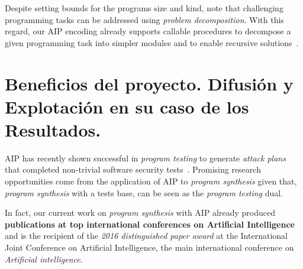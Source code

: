 \documentclass[10pt,a4paper]{paper}
\begin{document}
Despite setting bounds for the programs size and kind, note that challenging programming tasks can be addressed using {\em problem decomposition}. With this regard, our AIP encoding already supports callable procedures to decompose a given programming task into simpler modules and to enable recursive solutions~\cite{sergio:aprograming:icaps16,sergio:aprograming:ijcai16}.


\newpage
\section{Beneficios del proyecto. Difusión y Explotación en su caso de los Resultados.}
\label{subsec:beneficios}
AIP has recently shown successful in {\em program testing} to generate {\em attack plans} that completed non-trivial software security tests~\cite{hoffmann2015simulated,steinmetz2016revisiting,shmaryahu2016constructing,steinmetz2016goal}. Promising research opportunities come from the application of AIP to {\em program synthesis} given that, {\em program synthesis} with a tests base, can be seen as the {\em program testing} dual.

In fact, our current work on {\em program synthesis} with AIP already produced {\bf publications at top international conferences on Artificial Intelligence}~\cite{segovia2017generating,sergio:aprogramingb:ijcai16,sergio:aprograming:ijcai16,sergio:aprograming:icaps16} and is the recipient of the {\it 2016 distinguished paper award} at the International Joint Conference on Artificial Intelligence, the main international conference on {\em Artificial intelligence}. 
\end{document}
